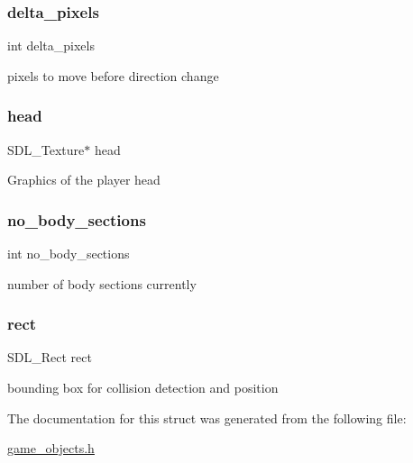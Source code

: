\subsubsection{\texorpdfstring{delta\_pixels}{delta\_pixels}}
{\footnotesize\ttfamily int delta\+\_\+pixels}

pixels to move before direction change \mbox{\label{structplayer__object_a156af47b8be9c09879c063ad443877a5}} 
\subsubsection{\texorpdfstring{head}{head}}
{\footnotesize\ttfamily S\+D\+L\+\_\+\+Texture$\ast$ head}

Graphics of the player head \mbox{\label{structplayer__object_a06948963e49fd8de64945937788fc3f8}} 
\subsubsection{\texorpdfstring{no\_body\_sections}{no\_body\_sections}}
{\footnotesize\ttfamily int no\+\_\+body\+\_\+sections}

number of body sections currently \mbox{\label{structplayer__object_a55aefd071649ac9dd8133e2d8a52d11f}} 
\subsubsection{\texorpdfstring{rect}{rect}}
{\footnotesize\ttfamily S\+D\+L\+\_\+\+Rect rect}

bounding box for collision detection and position 

The documentation for this struct was generated from the following file\+:\begin{DoxyCompactItemize}
\item 
\mbox{\hyperlink{game__objects_8h}{game\+\_\+objects.\+h}}\end{DoxyCompactItemize}

